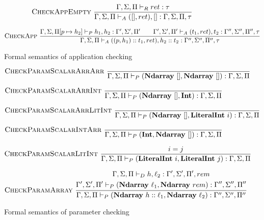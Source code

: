 \documentclass[12pt]{report}
\begin{document}
\begin{figure}
    $$\textsc{CheckAppEmpty}~\frac{\Gamma, \Sigma, \Pi \vdash_R ret : \tau}{\Gamma, \Sigma, \Pi \vdash_A ([], ret), [] : \Gamma, \Sigma, \Pi, \tau}$$

    $$\textsc{CheckApp}~\frac{\Gamma, \Sigma, \Pi[p \mapsto h_2] \vdash_P h_1, h_2 : \Gamma', \Sigma', \Pi' \qquad \Gamma', \Sigma', \Pi' \vdash_A (t_1, ret), t_2 : \Gamma'', \Sigma'', \Pi'', \tau}{\Gamma, \Sigma, \Pi \vdash_A ((p, h_1) :: t_1, ret), h_2 :: t_2 : \Gamma'', \Sigma'', \Pi'', \tau}$$
    \caption{Formal semantics of application checking}
    \label{semantics:app}
\end{figure}

\begin{figure}
    $$\textsc{CheckParamScalarArrArr}~\frac{}{\Gamma, \Sigma, \Pi \vdash_P (\textbf{Ndarray}~[], \textbf{Ndarray}~[]) : \Gamma, \Sigma, \Pi}$$

    $$\textsc{CheckParamScalarArrInt}~\frac{}{\Gamma, \Sigma, \Pi \vdash_P (\textbf{Ndarray}~[], \textbf{Int}) : \Gamma, \Sigma, \Pi}$$

    $$\textsc{CheckParamScalarArrLitInt}~\frac{}{\Gamma, \Sigma, \Pi \vdash_P (\textbf{Ndarray}~[], \textbf{LiteralInt}~i) : \Gamma, \Sigma, \Pi}$$

    $$\textsc{CheckParamScalarIntArr}~\frac{}{\Gamma, \Sigma, \Pi \vdash_P (\textbf{Int}, \textbf{Ndarray}~[]) : \Gamma, \Sigma, \Pi}$$

    $$\textsc{CheckParamScalarLitInt}~\frac{i = j}{\Gamma, \Sigma, \Pi \vdash_P (\textbf{LiteralInt}~i, \textbf{LiteralInt}~j) : \Gamma, \Sigma, \Pi}$$

    $$\textsc{CheckParamArray}~\frac{\begin{gathered}\Gamma, \Sigma, \Pi \vdash_D h, \ell_2 : \Gamma', \Sigma', \Pi', rem \\ \Gamma', \Sigma', \Pi' \vdash_P (\textbf{Ndarray}~\ell_1, \textbf{Ndarray}~rem) : \Gamma'', \Sigma'', \Pi''\end{gathered}}{\Gamma, \Sigma, \Pi \vdash_P (\textbf{Ndarray}~h :: \ell_1, \textbf{Ndarray}~\ell_2) : \Gamma'', \Sigma'', \Pi''}$$
    \caption{Formal semantics of parameter checking}
    \label{semantics:param}
\end{figure}
\end{document}
